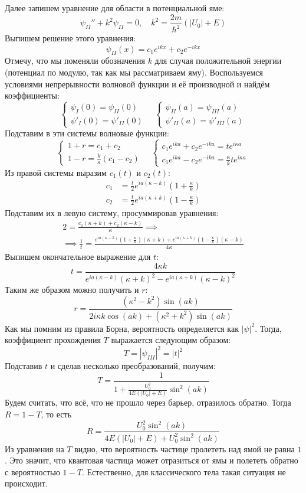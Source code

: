 Далее запишем уравнение для области в потенциальной яме:
\[
\psi_{II}'' + k^2\psi_{II} = 0, \quad k^2 = \frac{2m}{\hbar^2}(|U_0| + E)
\]
Выпишем решение этого уравнения:
\[
\psi_{II}(x) = c_1e^{ikx} + c_2e^{-ikx}
\]
Отмечу, что мы поменяли обозначения $k$ для случая положительной энергии (потенциал по модулю, так как мы рассматриваем яму). Воспользуемся условиями непрерывности волновой функции и её производной и найдём коэффициенты:
\[
\begin{cases}
    \psi_I(0) = \psi_{II}(0) \\
    \psi'_I(0) = \psi'_{II}(0) 
\end{cases}
\quad
\begin{cases}
    \psi_{II}(a) = \psi_{III}(a) \\
    \psi'_{II}(a) = \psi'_{III}(a) 
\end{cases}
\]
Подставим в эти системы волновые функции:
\[
\begin{cases}
    1 + r = c_1 + c_2 \\
    1-r = \frac{k}{\kappa}(c_1 - c_2) 
\end{cases}
\quad
\begin{cases}
    c_1e^{ika} + c_2e^{-ika} = te^{i\kappa a}\\
    c_1e^{ika} - c_2e^{-ika} = \frac{\kappa}{k}te^{i\kappa a}
\end{cases}
\]
Из правой системы выразим $c_1(t)$ и $c_2(t)$:
\begin{align*}
c_1 &= \frac{t}{2}e^{ia(\kappa - k)}(1 + \frac{\kappa}{k})\\
c_2 &= \frac{t}{2}e^{ia(\kappa + k)}(1 - \frac{\kappa}{k})
\end{align*}
Подставим их в левую систему, просуммировав уравнения:
\begin{gather*}
2 = \frac{c_1(\kappa + k) + c_2 (\kappa - k)}{\kappa}  \implies \\ 
\implies \frac{1}{t} = \frac{e^{ia(\kappa - k)}(1 + \frac{\kappa}{k})(\kappa + k) + e^{ia(\kappa + k)}(1 - \frac{\kappa}{k}) (\kappa - k) }{4\kappa}
\end{gather*}
Выпишем окончательное выражение для $t$:
\[
t = \frac{4\kappa k}{e^{ia(\kappa - k)}(\kappa + k)^2 - e^{ia(\kappa + k)}(\kappa - k)^2}
\]
Таким же образом можно получить и $r$:
\[
r = \frac{(\kappa^2 - k^2)\sin (ak)}{2i\kappa k\cos(ak) + (\kappa^2 + k^2)\sin (ak)}
\]
Как мы помним из правила Борна, вероятность определяется как $|\psi|^2$. Тогда, коэффициент прохождения $T$ выражается следующим образом:
\[
T = |\psi_{III}|^2 = |t|^2
\]
Подставив $t$ и сделав несколько преобразований, получим:
\[
T = \frac{1}{1 + \frac{U_0^2}{4E(|U_0| + E)}\sin^2 (ak)}
\]
Будем считать, что всё, что не прошло через барьер, отразилось обратно. Тогда $R = 1 - T$, то есть
\[
R = \frac{U_0^2 \sin^2(ak)}{4E(|U_0| + E) + U_0^2 \sin^2(ak)}
\]
Из уравнения на $T$ видно, что вероятность частице пролететь над ямой не равна $1$. Это значит, что квантовая частица может отразиться от ямы и полететь обратно с вероятностью $1 - T$. Естественно, для классического тела такая ситуация не происходит.


